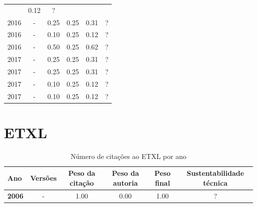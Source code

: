 \begin{table}[H]
\begin{tabular}{| l | c | c | c | c | c |}
          &
            {\color{red} 0.12}
          &
          ?
          \\
            2016
          &
          -
          &
          0.25
          &
          0.25
          &
            {\color{red} 0.31}
          &
          ?
          \\
            2016
          &
          -
          &
          0.10
          &
          0.25
          &
            {\color{red} 0.12}
          &
          ?
          \\
            2016
          &
          -
          &
          0.50
          &
          0.25
          &
            {\color{blue} 0.62}
          &
          ?
          \\
\hline
            2017
          &
          -
          &
          0.25
          &
          0.25
          &
            {\color{red} 0.31}
          &
          ?
          \\
            2017
          &
          -
          &
          0.25
          &
          0.25
          &
            {\color{red} 0.31}
          &
          ?
          \\
            2017
          &
          -
          &
          0.10
          &
          0.25
          &
            {\color{red} 0.12}
          &
          ?
          \\
            2017
          &
          -
          &
          0.10
          &
          0.25
          &
            {\color{red} 0.12}
          &
          ?
          \\
\hline
\end{tabular}
\end{table}



\section{ETXL}



\begin{table}[H]
\caption{Número de citações ao ETXL por ano}
\centering
\begin{tabular}{| l | c | c | c | c | c |}
  \hline
  Ano & Versões & Peso da citação & Peso da autoria & Peso final & Sustentabilidade técnica \\
  \hline
            {\bf 2006}
          &
          -
          &
          1.00
          &
          0.00
          &
            {\color{blue} 1.00}
          &
          ?
          \\
\hline
\end{tabular}
\end{table}



